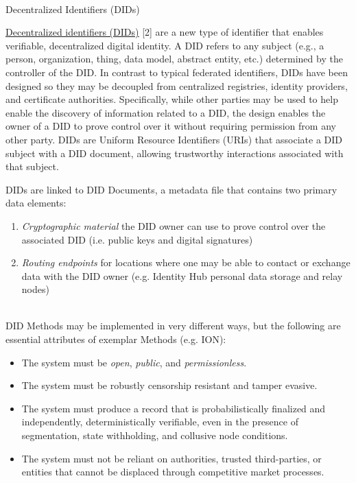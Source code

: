 \documentclass[11pt]{article}
\begin{document}
{\LARGE  \\ Decentralized Identifiers (DIDs)}

\vspace{1\baselineskip}
\href{https://www.w3.org/TR/did-core}{\uline{\textcolor[HTML]{1155CC}{Decentralized identifiers (DIDs)}}} [2] are a new type of identifier that enables verifiable, decentralized digital identity. A DID refers to any subject (e.g., a person, organization, thing, data model, abstract entity, etc.) determined by the controller of the DID. In contrast to typical federated identifiers, DIDs have been designed so they may be decoupled from centralized registries, identity providers, and certificate authorities. Specifically, while other parties may be used to help enable the discovery of information related to a DID, the design enables the owner of a DID to prove control over it without requiring permission from any other party. DIDs are Uniform Resource Identifiers (URIs) that associate a DID subject with a DID document, allowing trustworthy interactions associated with that subject.

\vspace{1\baselineskip}
DIDs are linked to DID Documents, a metadata file that contains two primary data elements: \\ 

\begin{enumerate}
	\item \textit{Cryptographic material} the DID owner can use to prove control over the associated DID (i.e. public keys and digital signatures) 

	\item \textit{Routing endpoints} for locations where one may be able to contact or exchange data with the DID owner (e.g. Identity Hub personal data storage and relay nodes) 

\end{enumerate}
 \\ DID Methods may be implemented in very different ways, but the following are essential attributes of exemplar Methods (e.g. ION): \\ 

\begin{itemize}
	\item The system must be \textit{open}, \textit{public}, and \textit{permissionless}.

	\item The system must be robustly censorship resistant and tamper evasive.

	\item The system must produce a record that is probabilistically finalized and independently, deterministically verifiable, even in the presence of segmentation, state withholding, and collusive node conditions.

	\item The system must not be reliant on authorities, trusted third-parties, or entities that cannot be displaced through competitive market processes.

\vspace{1\baselineskip}
\end{itemize}
\end{document}
